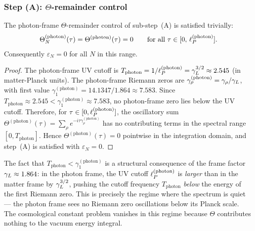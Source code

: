 \subsubsection*{Step (A): $\Theta$-remainder control}

\begin{proposition}
\label{prop:theta-remainder-trivial}
The photon-frame $\Theta$-remainder control of sub-step~(A) is
satisfied trivially:
\[
 \Theta^{(\mathrm{photon})}_N(\tau)
 = \Theta^{(\mathrm{photon})}(\tau)
 = 0
 \qquad
 \text{for all } \tau \in [0,\,\ell_P^{(\mathrm{photon})}].
\]
Consequently $\varepsilon_N = 0$ for all $N$ in this range.
\end{proposition}

\begin{proof}
The photon-frame UV cutoff is $T_{\mathrm{photon}} =
1/\ell_P^{(\mathrm{photon})} = \gamma_L^{3/2} \approx 2.545$ (in
matter-Planck units). The photon-frame Riemann zeros are
$\gamma_\rho^{(\mathrm{photon})} = \gamma_\rho/\gamma_L$, with first
value $\gamma_1^{(\mathrm{photon})} = 14.1347/1.864 \approx 7.583$.
Since $T_{\mathrm{photon}} \approx 2.545 < \gamma_1^{(\mathrm{photon})}
\approx 7.583$, no photon-frame zero lies below the UV cutoff.
Therefore, for $\tau \in [0, \ell_P^{(\mathrm{photon})}]$, the
oscillatory sum $\Theta^{(\mathrm{photon})}(\tau) =
\sum_\rho e^{-i\tau\gamma_\rho^{(\mathrm{photon})}}$ has no
contributing terms in the spectral range
$[0, T_{\mathrm{photon}}]$.
Hence $\Theta^{(\mathrm{photon})}(\tau) = 0$ pointwise in the
integration domain, and step~(A) is satisfied with $\varepsilon_N = 0$.
\end{proof}

\begin{remark}
\label{rem:photon-frame-below-first-zero}
The fact that $T_{\mathrm{photon}} < \gamma_1^{(\mathrm{photon})}$
is a structural consequence of the frame factor $\gamma_L \approx 1.864$:
in the photon frame, the UV cutoff $\ell_P^{(\mathrm{photon})}$ is
\emph{larger} than in the matter frame by $\gamma_L^{3/2}$, pushing the
cutoff frequency $T_{\mathrm{photon}}$ \emph{below} the energy of
the first Riemann zero. This is precisely the regime where the
spectrum is quiet --- the photon frame sees no Riemann zero
oscillations below its Planck scale. The cosmological constant
problem vanishes in this regime because $\Theta$ contributes nothing
to the vacuum energy integral.
\end{remark}

